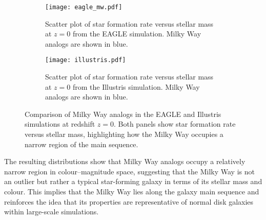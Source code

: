 \documentclass[10pt]{article}
\begin{document}
\begin{figure}
    \centering
    \begin{subfigure}[t]{0.48\textwidth}
        \centering
        \texttt{[image: eagle\_mw.pdf]}
        \caption{Scatter plot of star formation rate versus stellar mass at $ z = 0 $ from the EAGLE simulation. Milky Way analogs are shown in blue.}
        \label{fig:eagle_mw}
    \end{subfigure}
    \hfill
    \begin{subfigure}[t]{0.48\textwidth}
        \centering
        \texttt{[image: illustris.pdf]}
        \caption{Scatter plot of star formation rate versus stellar mass at $ z = 0 $ from the Illustris simulation. Milky Way analogs are shown in blue.}
        \label{fig:illustris_mw}
    \end{subfigure}
    \caption{Comparison of Milky Way analogs in the EAGLE and Illustris simulations at redshift $z = 0 $. Both panels show star formation rate versus stellar mass, highlighting how the Milky Way occupies a narrow region of the main sequence.}
    \label{fig:mw_analogs}
\end{figure}


The resulting distributions show that Milky Way analogs occupy a relatively narrow region in colour–magnitude space, suggesting that the Milky Way is not an outlier but rather a typical star-forming galaxy in terms of its stellar mass and colour. This implies that the Milky Way lies along the galaxy main sequence and reinforces the idea that its properties are representative of normal disk galaxies within large-scale simulations.
\end{document}
